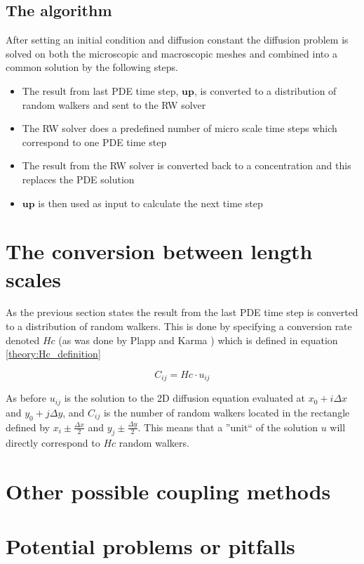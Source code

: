 \subsection{The algorithm}
After setting an initial condition and diffusion constant the diffusion problem is solved on both the microscopic and macroscopic meshes and combined into a common solution by the following steps.
\begin{itemize}
 \item The result from last PDE time step, $\mathbf{up}$, is converted to a distribution of random walkers and sent to the RW solver
 \item The RW solver does a predefined number of micro scale time steps which correspond to one PDE time step
 \item The result from the RW solver is converted back to a concentration and this replaces the PDE solution
 \item $\mathbf{up}$ is then used as input to calculate the next time step
\end{itemize}

\section{The conversion between length scales}
As the previous section states the result from the last PDE time step is converted to a distribution of random walkers. 
This is done by specifying a conversion rate denoted $Hc$ (as was done by Plapp and Karma \cite{plapp2000multiscale}) which is defined in equation \eqref{theory:Hc_definition}

\begin{equation}\label{theory:Hc_definition}
 C_{ij} = Hc\cdot u_{ij}
\end{equation}

As before $u_{ij}$ is the solution to the 2D diffusion equation evaluated at $x_0 +i\Delta x$ and $y_0 +j\Delta y$, and $C_{ij}$ is the number of random walkers located in the rectangle defined by $x_i\pm\frac{\Delta x}{2}$ and $y_j\pm\frac{\Delta y}{2}$. 
This means that a ''unit`` of the solution $u$ will directly correspond to $Hc$ random walkers.

\section{Other possible coupling methods}


\section{Potential problems or pitfalls}\label{problems_and_pitfalls}
 
